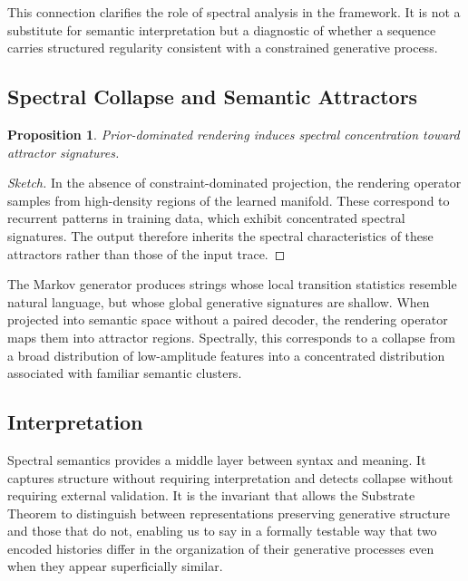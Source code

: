 \documentclass[12pt, a4paper]{article}
\theoremstyle{plain}
\newtheorem{proposition}[theorem]{Proposition}
\theoremstyle{definition}
\theoremstyle{remark}
\begin{document}
This connection clarifies the role of spectral analysis in the framework. It is not a substitute for semantic interpretation but a diagnostic of whether a sequence carries structured regularity consistent with a constrained generative process.

\subsection{Spectral Collapse and Semantic Attractors}

\begin{proposition}
Prior-dominated rendering induces spectral concentration toward attractor signatures.
\end{proposition}

\begin{proof}[Sketch]
In the absence of constraint-dominated projection, the rendering operator samples from high-density regions of the learned manifold. These correspond to recurrent patterns in training data, which exhibit concentrated spectral signatures. The output therefore inherits the spectral characteristics of these attractors rather than those of the input trace.
\end{proof}

The Markov generator produces strings whose local transition statistics resemble natural language, but whose global generative signatures are shallow. When projected into semantic space without a paired decoder, the rendering operator maps them into attractor regions. Spectrally, this corresponds to a collapse from a broad distribution of low-amplitude features into a concentrated distribution associated with familiar semantic clusters.

\subsection{Interpretation}

Spectral semantics provides a middle layer between syntax and meaning. It captures structure without requiring interpretation and detects collapse without requiring external validation. It is the invariant that allows the Substrate Theorem to distinguish between representations preserving generative structure and those that do not, enabling us to say in a formally testable way that two encoded histories differ in the organization of their generative processes even when they appear superficially similar.

\end{document}
